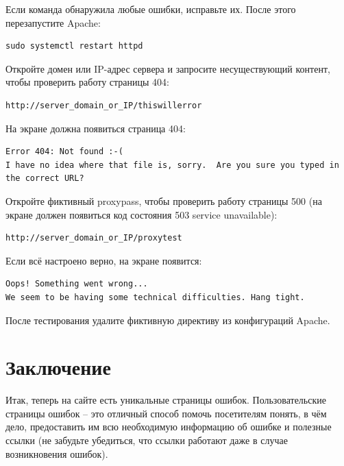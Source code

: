 \documentclass[14pt, a4paper]{article}
\begin{document}
Если команда обнаружила любые ошибки, исправьте их. После этого перезапустите Apache:

\begin{lstlisting}
sudo systemctl restart httpd
\end{lstlisting}

Откройте домен или IP-адрес сервера и запросите несуществующий контент, чтобы проверить работу страницы 404:

\begin{lstlisting}
http://server_domain_or_IP/thiswillerror
\end{lstlisting}

На экране должна появиться страница 404:

\begin{lstlisting}
Error 404: Not found :-(
I have no idea where that file is, sorry.  Are you sure you typed in the correct URL?
\end{lstlisting}

Откройте фиктивный proxypass, чтобы проверить работу страницы 500 (на экране должен появиться код состояния 503 service unavailable):

\begin{lstlisting}
http://server_domain_or_IP/proxytest
\end{lstlisting}

Если всё настроено верно, на экране появится:

\begin{lstlisting}
Oops! Something went wrong...
We seem to be having some technical difficulties. Hang tight.
\end{lstlisting}

После тестирования удалите фиктивную директиву из конфигураций Apache.\newpage


\section*{Заключение}

Итак, теперь на сайте есть уникальные страницы ошибок. Пользовательские страницы ошибок – это отличный способ 
помочь посетителям понять, в чём дело, предоставить им всю необходимую информацию об ошибке и полезные ссылки 
(не забудьте убедиться, что ссылки работают даже в случае возникновения ошибок).
\end{document}

